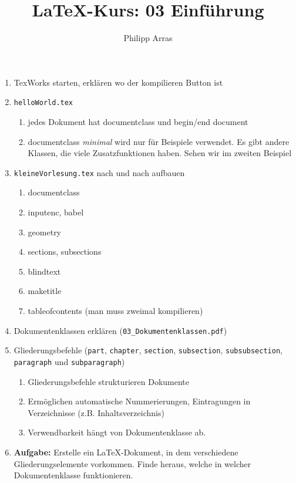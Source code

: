 \documentclass[11pt,a4paper]{article}
\author{Philipp Arras}
\title{\LaTeX -Kurs: 03 Einführung}
\begin{document}
\maketitle

\begin{enumerate}
\item TexWorks starten, erklären wo der kompilieren Button ist
\item \verb|helloWorld.tex|
	\begin{enumerate}
	\item jedes Dokument hat documentclass und begin/end document
	\item documentclass \emph{minimal} wird nur für Beispiele verwendet. Es gibt andere Klassen, die viele Zusatzfunktionen haben. Sehen wir im zweiten Beispiel
	\end{enumerate}
\item \verb|kleineVorlesung.tex| nach und nach aufbauen
	\begin{enumerate}
	\item documentclass
	\item inputenc, babel
	\item geometry
	\item sections, subsections
	\item blindtext
	\item maketitle
	\item tableofcontents (man muss zweimal kompilieren)	
	\end{enumerate}
\item Dokumentenklassen erklären (\verb|03_Dokumentenklassen.pdf|)
\item Gliederungsbefehle (\verb|part|, \verb|chapter|, \verb|section|, \verb|subsection|, \verb|subsubsection|, \verb|paragraph| und \verb|subparagraph|)
	\begin{enumerate}
		\item Gliederungsbefehle strukturieren Dokumente
		\item Ermöglichen automatische Nummerierungen, Eintragungen in Verzeichnisse (z.B. Inhaltsverzeichnis)
		\item  Verwendbarkeit hängt von Dokumentenklasse ab.
	\end{enumerate}	
\item \textbf{Aufgabe: } Erstelle ein \LaTeX -Dokument, in dem verschiedene Gliederungselemente vorkommen. Finde heraus, welche in welcher Dokumentenklasse funktionieren.
\end{enumerate}
\end{document}
